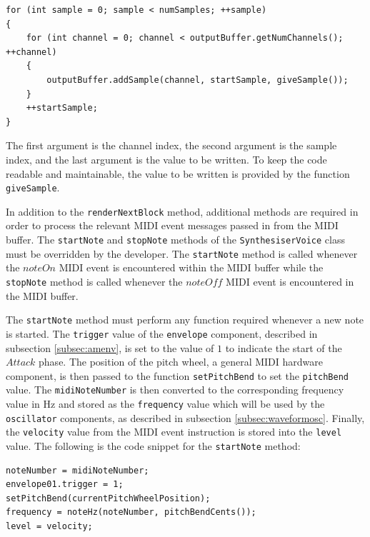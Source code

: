\documentclass[a4paper,12pt]{report}
\begin{document}
 \noindent\begin{minipage}{\linewidth} \begin{lstlisting}[caption={addSample()},label={code:addsample},captionpos=b]
for (int sample = 0; sample < numSamples; ++sample)
{
    for (int channel = 0; channel < outputBuffer.getNumChannels(); ++channel)
    {
        outputBuffer.addSample(channel, startSample, giveSample());
    }
    ++startSample;
}
\end{lstlisting} \end{minipage}

The first argument is the channel index, the second argument is the sample index, and the last argument is the value to be written. To keep the code readable and maintainable, the value to be written is provided by the function \texttt{giveSample}. 

In addition to the \texttt{renderNextBlock} method, additional methods are required in order to process the relevant MIDI event messages passed in from the MIDI buffer. The \texttt{startNote} and \texttt{stopNote} methods of the \texttt{SynthesiserVoice} class must be overridden by the developer. The \texttt{startNote} method is called whenever the $noteOn$ MIDI event is encountered within the MIDI buffer while the \texttt{stopNote} method is called whenever the $noteOff$ MIDI event is encountered in the MIDI buffer.	

The \texttt{startNote} method must perform any function required whenever a new note is started. The \texttt{trigger} value of the \texttt{envelope} component, described in subsection \ref{subsec:amenv}, is set to the value of $1$ to indicate the start of the $Attack$ phase. The position of the pitch wheel, a general MIDI hardware component, is then passed to the function \texttt{setPitchBend} to set the \texttt{pitchBend} value. The \texttt{midiNoteNumber} is then converted to the corresponding frequency value in Hz and stored as the \texttt{frequency} value which will be used by the \texttt{oscillator} components, as described in subsection \ref{subsec:waveformosc}. Finally, the \texttt{velocity} value from the MIDI event instruction is stored into the \texttt{level} value. The following is the code snippet for the \texttt{startNote} method:

 \noindent\begin{minipage}{\linewidth} \begin{lstlisting}[caption={startNote()},label={code:startnote},captionpos=b]
noteNumber = midiNoteNumber;
envelope01.trigger = 1;
setPitchBend(currentPitchWheelPosition);
frequency = noteHz(noteNumber, pitchBendCents());
level = velocity;
\end{lstlisting} \end{minipage}
\end{document}
